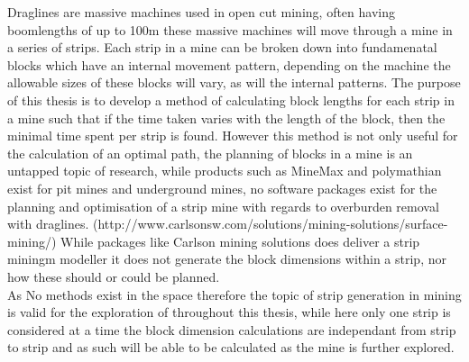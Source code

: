 




% 
Draglines are massive machines used in open cut mining, often having boomlengths of up to 100m these massive machines will move through a mine in a series of strips. Each strip in a mine can be broken down into fundamenatal blocks which have an internal movement pattern, depending on the machine the allowable sizes of these blocks will vary, as will the internal patterns. The purpose of this thesis is to develop a method of calculating block lengths for each strip in a mine such that if the time taken varies with the length of the block, then the minimal time spent per strip is found. However this method is not only useful for the calculation of an optimal path, the planning of blocks in a mine is an untapped topic of research, while products such as MineMax and polymathian exist for pit mines and underground mines, no software packages exist for the planning and optimisation of a strip mine with regards to overburden removal with draglines. (http://www.carlsonsw.com/solutions/mining-solutions/surface-mining/) While packages like Carlson mining solutions does deliver a strip miningm modeller it does not generate the block dimensions within a strip, nor how these should or could be planned. \\
As No methods exist in the space therefore the topic of strip generation in mining is valid for the exploration of throughout this thesis, while here only one strip is considered at a time the block dimension calculations are independant from strip to strip and as such will be able to be calculated as the mine is further explored. 


